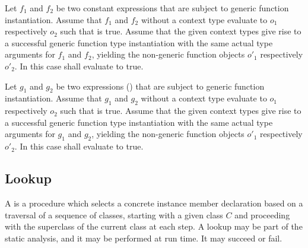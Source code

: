 \documentclass[makeidx]{article}
\begin{document}
{\LMHash{}%
Let $f_1$ and $f_2$ be two constant expressions that are subject to
generic function instantiation.
Assume that $f_1$ and $f_2$ without a context type evaluate to $o_1$
respectively $o_2$ such that  is true.
Assume that the given context types give rise to a successful
generic function type instantiation with
the same actual type arguments for $f_1$ and $f_2$,
yielding the non-generic function objects $o'_1$ respectively $o'_2$.
In this case  shall evaluate to true.


\LMHash{}%
Let $g_1$ and $g_2$ be two expressions
()
that are subject to generic function instantiation.
Assume that $g_1$ and $g_2$ without a context type evaluate to $o_1$
respectively $o_2$ such that  is true.
Assume that the given context types give rise to a successful
generic function type instantiation with
the same actual type arguments for $g_1$ and $g_2$,
yielding the non-generic function objects $o'_1$ respectively $o'_2$.
In this case  shall evaluate to true.




\subsection{Lookup}

\LMHash{}%
A  is a procedure which selects
a concrete instance member declaration based on a traversal of
a sequence of classes, starting with a given class $C$
and proceeding with the superclass of the current class at each step.
A lookup may be part of the static analysis, and it may be performed
at run time. It may succeed or fail.

}
\end{document}
